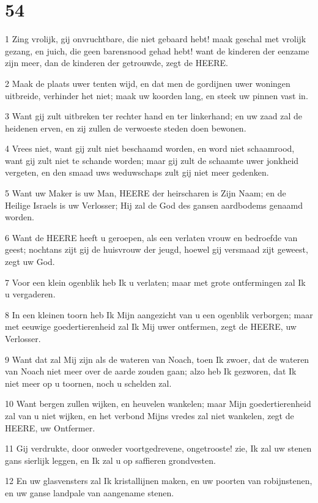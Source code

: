 \chapter{54}

\par 1 Zing vrolijk, gij onvruchtbare, die niet gebaard hebt! maak geschal met vrolijk gezang, en juich, die geen barensnood gehad hebt! want de kinderen der eenzame zijn meer, dan de kinderen der getrouwde, zegt de HEERE.
\par 2 Maak de plaats uwer tenten wijd, en dat men de gordijnen uwer woningen uitbreide, verhinder het niet; maak uw koorden lang, en steek uw pinnen vast in.
\par 3 Want gij zult uitbreken ter rechter hand en ter linkerhand; en uw zaad zal de heidenen erven, en zij zullen de verwoeste steden doen bewonen.
\par 4 Vrees niet, want gij zult niet beschaamd worden, en word niet schaamrood, want gij zult niet te schande worden; maar gij zult de schaamte uwer jonkheid vergeten, en den smaad uws weduwschaps zult gij niet meer gedenken.
\par 5 Want uw Maker is uw Man, HEERE der heirscharen is Zijn Naam; en de Heilige Israels is uw Verlosser; Hij zal de God des gansen aardbodems genaamd worden.
\par 6 Want de HEERE heeft u geroepen, als een verlaten vrouw en bedroefde van geest; nochtans zijt gij de huisvrouw der jeugd, hoewel gij versmaad zijt geweest, zegt uw God.
\par 7 Voor een klein ogenblik heb Ik u verlaten; maar met grote ontfermingen zal Ik u vergaderen.
\par 8 In een kleinen toorn heb Ik Mijn aangezicht van u een ogenblik verborgen; maar met eeuwige goedertierenheid zal Ik Mij uwer ontfermen, zegt de HEERE, uw Verlosser.
\par 9 Want dat zal Mij zijn als de wateren van Noach, toen Ik zwoer, dat de wateren van Noach niet meer over de aarde zouden gaan; alzo heb Ik gezworen, dat Ik niet meer op u toornen, noch u schelden zal.
\par 10 Want bergen zullen wijken, en heuvelen wankelen; maar Mijn goedertierenheid zal van u niet wijken, en het verbond Mijns vredes zal niet wankelen, zegt de HEERE, uw Ontfermer.
\par 11 Gij verdrukte, door onweder voortgedrevene, ongetrooste! zie, Ik zal uw stenen gans sierlijk leggen, en Ik zal u op saffieren grondvesten.
\par 12 En uw glasvensters zal Ik kristallijnen maken, en uw poorten van robijnstenen, en uw ganse landpale van aangename stenen.
